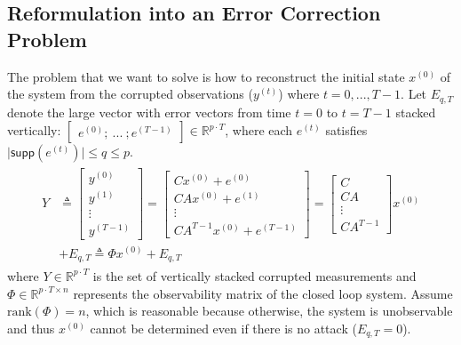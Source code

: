 \documentclass[../../thesis.tex]{subfiles}
\begin{document}
\subsection{Reformulation into an Error Correction Problem} \label{sec:err_corr}

The problem that we want to solve is how to reconstruct the initial state $x^{(0)}$ of the system from the corrupted observations ($y^{(t)}$) where $t=0,...,T-1$.
Let $E_{q,T}$ denote the large vector with error vectors from time $t=0$ to $t=T-1$ stacked vertically: $\begin{bmatrix} e^{(0)}; ~ ...~  ;  e^{(T-1)} \end{bmatrix}   \in  \mathbb{R}^{p\cdot T} $, where each $e^{(t)}$ satisfies $\lvert \textsf{supp}(e^{(t)}) \rvert \le q \le p $.%
\begin{eqnarray} \label{eq:sys_err_corr}
\begin{aligned}
	Y &\triangleq \begin{bmatrix} y^{(0)} \\ y^{(1)} \\ \vdots \\ y^{(T-1)} \end{bmatrix} 
		= \begin{bmatrix} Cx^{(0)} + e^{(0)} \\ CA x^{(0)} + e^{(1)} \\ \vdots \\ CA^{T-1} x^{(0)} + e^{(T-1)} \end{bmatrix} =
		\begin{bmatrix} C \\ CA \\ \vdots \\ CA^{T-1} \end{bmatrix} x^{(0)} \\&+ E_{q,T} \triangleq \Phi x^{(0)} + E_{q,T} 
\end{aligned} 
		\label{eq:decoder_Phi}
\end{eqnarray}
where $Y \in \mathbb{R}^{p\cdot T}$ is the set of vertically stacked corrupted measurements and $\Phi \in \mathbb{R}^{p\cdot T \times n}$ represents the observability matrix of the closed loop system. Assume $\text{rank}(\Phi) = n$, which is reasonable because otherwise, the system is unobservable and thus $x^{(0)}$ cannot be determined even if there is no attack ($E_{q,T} = 0$).%
\end{document}
